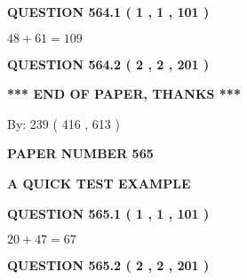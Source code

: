 \documentclass[12pt]{article}
\begin{document}
   
  
\vspace{0.2in}
  
{\textbf{\Large{QUESTION
564.1 
 ( 1 , 1 , 101 )
}}}
  
  
 
 

$ %
48 +  %
61=   %
109$
 
 
  
\vspace{0.2in}
  
{\textbf{\Large{QUESTION
564.2 
 ( 2 , 2 , 201 )
}}}
  
  
   
   
 \vspace{0.2in}
 
   
   
   
   
\vspace{1.0in} 
{\textbf{\large{ *** END OF PAPER, THANKS *** }}} 
   
   
\hspace{1.0in} By: 
 239 ( 416 ,  613 )
   
   
   
   
\newpage 
\setcounter{page}{ 
   565001 } 
   
   
   
   
 {\textbf{ \Large{ PAPER NUMBER  565  }}}
   
   
\vspace{0.2in}
   
   
   
   
   
   
 \vspace{0.2in}
{\LARGE {\textbf{ A QUICK TEST EXAMPLE}}}
   
   
  
\vspace{0.2in}
  
{\textbf{\Large{QUESTION
565.1 
 ( 1 , 1 , 101 )
}}}
  
  
 
 

$ %
20 +  %
47=   %
67$
 
 
  
\vspace{0.2in}
  
{\textbf{\Large{QUESTION
565.2 
 ( 2 , 2 , 201 )
}}}
  
  
   
\end{document}
